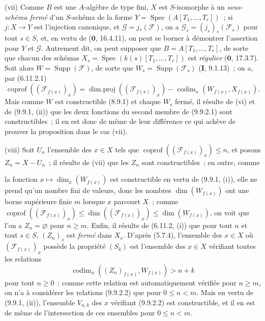 (vii) Comme $B$ est une $A$-algèbre de type fini, $X$ est $S$-isomorphe à un
\emph{sous-schéma fermé} d'un $S$-schéma de la forme
$Y=\operatorname{Spec}(A[T_1,\ldots,T_r])$~; si $j:X\to Y$ est l'injection
canonique, et $\mathcal G=j_*(\mathcal F)$, on a
$\mathcal G_s=(j_s)_*(\mathcal F_s)$ pour tout $s\in S$, et, en vertu de
($\mathbf 0$, 16.4.11), on peut se borner à démontrer l'assertion pour $Y$ et
$\mathcal G$. Autrement dit, on peut supposer que $B=A[T_1,\ldots,T_r]$, de
sorte que chacun des schémas $X_s=\operatorname{Spec}(k(s)[T_1,\ldots,T_r])$
est \emph{régulier} ($\mathbf 0$, 17.3.7). Soit alors
$W=\operatorname{Supp}(\mathcal F)$, de sorte que
$W_s=\operatorname{Supp}(\mathcal F_s)$ (\textbf{I}, 9.1.13)~; on a, par
(6.11.2.1)
\begin{equation}
\tag{9.9.2.1}
\label{IV.9.9.2.1-fr}
\operatorname{coprof}((\mathcal F_{f(x)})_x)=
\operatorname{dim.proj}((\mathcal F_{f(x)})_x)-
\operatorname{codim}_x(W_{f(x)},X_{f(x)}).
\end{equation}
Mais comme $W$ est constructible (8.9.1) et chaque $W_s$ fermé, il résulte de
(vi) et de (9.9.1, (ii)) que les deux fonctions du second membre de (9.9.2.1)
sont constructibles~; il en est donc de même de leur différence ce qui achève
de prouver la proposition dans le cas (vii).

(viii) Soit $U_n$ l'ensemble des $x\in X$ tels que
$\operatorname{coprof}((\mathcal F_{f(x)})_x)\leq n$, et posons
$Z_n=X-U_n$~; il résulte de (vii) que les $Z_n$ sont constructibles~; en outre,
comme


la fonction $x\mapsto\dim_x(W_{f(x)})$ est constructible en vertu de
(9.9.1, (i)), elle ne prend qu'un nombre fini de valeurs, donc les nombres
$\dim(W_{f(x)})$ ont une borne supérieure finie $m$ lorsque $x$ parcourt $X$~;
comme
$\operatorname{coprof}((\mathcal F_{f(x)})_x)\leq
\dim((\mathcal F_{f(x)})_x)\leq\dim(W_{f(x)})$, on voit que l'on a
$Z_n=\varnothing$ pour $n\geq m$. Enfin, il résulte de (6.11.2, (i)) que pour
tout $n$ et tout $s\in S$, $(Z_n)_s$ est \emph{fermé} dans $X_s$. D'après
(5.7.4), l'ensemble des $x\in X$ où $(\mathcal F_{f(x)})_x$ possède la
propriété $(S_k)$ est l'ensemble des $x\in X$ vérifiant toutes les relations
\begin{equation}
\tag{9.9.2.2}
\label{IV.9.9.2.2-fr}
\operatorname{codim}_x((Z_n)_{f(x)},W_{f(x)})>n+k
\end{equation}
pour tout $n\geq0$~; comme cette relation est automatiquement vérifiée pour
$n\geq m$, on n'a à considérer les relations (9.9.2.2) que pour $0\leq n<m$.
Mais en vertu de (9.9.1, (ii)), l'ensemble $V_{n,k}$ des $x$ vérifiant (9.9.2.2)
est constructible, et il en est de même de l'intersection de ces ensembles pour
$0\leq n<m$.

